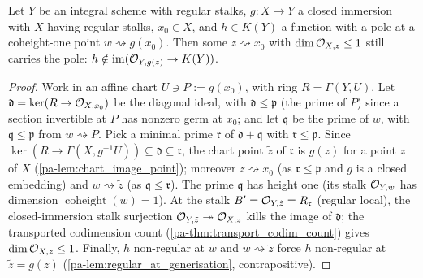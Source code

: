 \begin{theorem}
  \label{pa-thm:transport_kernel}
  \leanok

  Let \(Y\) be an integral scheme with regular stalks, \(g : X \to Y\) a closed
  immersion with \(X\) having regular stalks, \(x_0 \in X\), and \(h \in K(Y)\) a
  function with a pole at a coheight-one point \(w \rightsquigarrow g(x_0)\). Then
  some \(z \rightsquigarrow x_0\) with \(\dim\mathcal{O}_{X,z} \le 1\) still carries
  the pole: \(h \notin \operatorname{im}(\mathcal{O}_{Y,g(z)} \to K(Y))\).
\end{theorem}
\begin{proof}
  \leanok
  Work in an affine chart \(U \ni P := g(x_0)\), with ring \(R = \Gamma(Y, U)\).
  Let \(\mathfrak d = \ker(R \to \mathcal{O}_{X,x_0})\) be the diagonal ideal, with
  \(\mathfrak d \le \mathfrak p\) (the prime of \(P\)) since a section invertible
  at \(P\) has nonzero germ at \(x_0\); and let \(\mathfrak q\) be the prime of
  \(w\), with \(\mathfrak q \le \mathfrak p\) from \(w \rightsquigarrow P\). Pick
  a minimal prime \(\mathfrak r\) of \(\mathfrak d + \mathfrak q\) with
  \(\mathfrak r \le \mathfrak p\). Since \(\ker(R \to \Gamma(X, g^{-1}U))
  \subseteq \mathfrak d \subseteq \mathfrak r\), the chart point \(\tilde z\) of
  \(\mathfrak r\) is \(g(z)\) for a point \(z\) of \(X\)
  (\ref{pa-lem:chart_image_point}); moreover \(z \rightsquigarrow x_0\) (as
  \(\mathfrak r \le \mathfrak p\) and \(g\) is a closed embedding) and
  \(w \rightsquigarrow \tilde z\) (as \(\mathfrak q \le \mathfrak r\)). The prime
  \(\mathfrak q\) has height one (its stalk \(\mathcal{O}_{Y,w}\) has dimension
  \(\operatorname{coheight}(w) = 1\)). At the stalk \(B' = \mathcal{O}_{Y,\tilde z} =
  R_{\mathfrak r}\) (regular local), the closed-immersion stalk surjection
  \(\mathcal{O}_{Y,\tilde z} \twoheadrightarrow \mathcal{O}_{X,z}\) kills the image of
  \(\mathfrak d\); the transported codimension count
  (\ref{pa-thm:transport_codim_count}) gives \(\dim\mathcal{O}_{X,z} \le 1\). Finally,
  \(h\) non-regular at \(w\) and \(w \rightsquigarrow \tilde z\) force \(h\)
  non-regular at \(\tilde z = g(z)\) (\ref{pa-lem:regular_at_generisation},
  contrapositive).
\end{proof}

